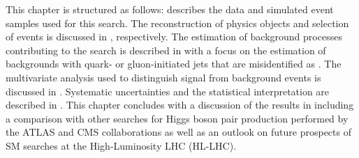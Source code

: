 This chapter is structured as follows:  describes
the data and simulated event samples used for this search. The reconstruction of
physics objects and selection of events is discussed in
, respectively. The
estimation of background processes contributing to the search is described in
 with a focus on the estimation of backgrounds
with quark- or gluon-initiated jets that are misidentified as \tauhadvis. The
multivariate analysis used to distinguish signal from background events is
discussed in . Systematic uncertainties and the
statistical interpretation are described in
. This chapter concludes with a
discussion of the results in  including a comparison
with other searches for Higgs boson pair production performed by the ATLAS and
CMS collaborations as well as an outlook on future prospects of SM \HH searches
at the High-Luminosity LHC (HL-LHC).


